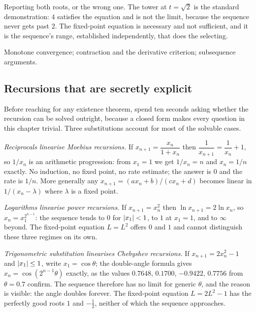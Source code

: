 \begin{trap}
Reporting both roots, or the wrong one. The tower at $t=\sqrt2$ is the standard demonstration: $4$ satisfies the equation and is not the limit, because the sequence never gets past $2$. The fixed-point equation is necessary and not sufficient, and it is the sequence's range, established independently, that does the selecting.
\end{trap}

\begin{seealsob}Monotone convergence; contraction and the derivative criterion; subsequence arguments.\end{seealsob}

\subsection{Recursions that are secretly explicit}

Before reaching for any existence theorem, spend ten seconds asking whether the recursion can be solved outright, because a closed form makes every question in this chapter trivial. Three substitutions account for most of the solvable cases.

\emph{Reciprocals linearise Moebius recursions.} If $x_{n+1}=\dfrac{x_n}{1+x_n}$ then $\dfrac{1}{x_{n+1}}=\dfrac{1}{x_n}+1$, so $1/x_n$ is an arithmetic progression: from $x_1=1$ we get $1/x_n=n$ and $x_n=1/n$ exactly. No induction, no fixed point, no rate estimate; the answer is $0$ and the rate is $1/n$. More generally any $x_{n+1}=(ax_n+b)/(cx_n+d)$ becomes linear in $1/(x_n-\lambda)$ where $\lambda$ is a fixed point.

\emph{Logarithms linearise power recursions.} If $x_{n+1}=x_n^2$ then $\ln x_{n+1}=2\ln x_n$, so $x_n=x_1^{2^{n-1}}$: the sequence tends to $0$ for $\left\lvert x_1\right\rvert<1$, to $1$ at $x_1=1$, and to $\infty$ beyond. The fixed-point equation $L=L^2$ offers $0$ and $1$ and cannot distinguish these three regimes on its own.

\emph{Trigonometric substitution linearises Chebyshev recursions.} If $x_{n+1}=2x_n^2-1$ and $\left\lvert x_1\right\rvert\leq1$, write $x_1=\cos\theta$; the double-angle formula gives $x_n=\cos(2^{n-1}\theta)$ exactly, as the values $0.7648$, $0.1700$, $-0.9422$, $0.7756$ from $\theta=0.7$ confirm. The sequence therefore has no limit for generic $\theta$, and the reason is visible: the angle doubles forever. The fixed-point equation $L=2L^2-1$ has the perfectly good roots $1$ and $-\tfrac12$, neither of which the sequence approaches.

